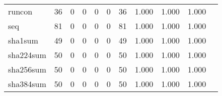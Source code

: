 \begin{longtable}{lp{1.20cm}p{1.20cm}p{1.20cm}p{1.20cm}p{1.20cm}p{1.20cm}p{1.20cm}p{1.20cm}p{1.20cm}p{1.20cm}}
runcon    &                                    36 &                                                  0 &                                                  0 &                                                  0 &                                                  0 &                                                 36 &                                         1.000 &                                              1.000 &                                              1.000 \\
seq       &                                    81 &                                                  0 &                                                  0 &                                                  0 &                                                  0 &                                                 81 &                                         1.000 &                                              1.000 &                                              1.000 \\
sha1sum   &                                    49 &                                                  0 &                                                  0 &                                                  0 &                                                  0 &                                                 49 &                                         1.000 &                                              1.000 &                                              1.000 \\
sha224sum &                                    50 &                                                  0 &                                                  0 &                                                  0 &                                                  0 &                                                 50 &                                         1.000 &                                              1.000 &                                              1.000 \\
sha256sum &                                    50 &                                                  0 &                                                  0 &                                                  0 &                                                  0 &                                                 50 &                                         1.000 &                                              1.000 &                                              1.000 \\
sha384sum &                                    50 &                                                  0 &                                                  0 &                                                  0 &                                                  0 &                                                 50 &                                         1.000 &                                              1.000 &                                              1.000 \\

\end{longtable}
